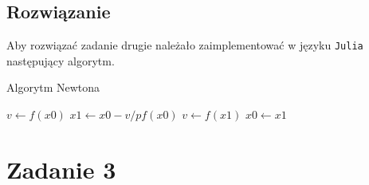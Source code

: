 \documentclass{article}
\begin{document}
\begin{center}
    \subsection{Rozwiązanie}
    \large Aby rozwiązać zadanie drugie należało zaimplementować w języku \texttt{Julia} następujący algorytm. 
    \begin{flushleft}
        \begin{algorithm}
            \caption{Algorytm Newtona}\label{alg:stycznych}
            \begin{algorithmic}
                \State$v \gets f(x0)$
                \EndIf
                \EndIf
                    \State$x1 \gets x0 - v/pf(x0)$
                    \State$v \gets f(x1)$
                    \EndIf
                    \State$x0 \gets x1$
                \EndFor
                \EndFunction
            \end{algorithmic}
        \end{algorithm}
    \end{flushleft}

    \section{Zadanie 3}

\end{center}
\end{document}
